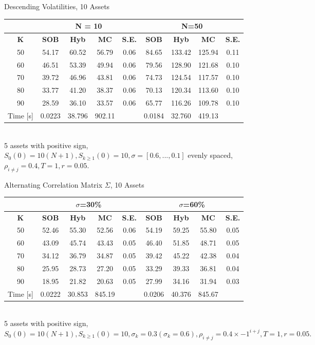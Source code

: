 \documentclass[a4paper]{article}
\begin{document}
\begin {table}[H]
\caption {Descending Volatilities, 10 Assets} 
\begin{center}
\begin{tabular}{c|c c c c|c c c c}
\hline
\multicolumn{1}{c|}{} & \multicolumn{4}{|c|}{N = 10} & \multicolumn{4}{|c}{N=50} \\ 
\hline
  \textbf{K} & \textbf{SOB} & \textbf{Hyb} & \textbf{MC} & \textbf{S.E.} & \textbf{SOB} & \textbf{Hyb} & \textbf{MC} & \textbf{S.E.}\\
50 &	54.17& 60.52 	& 56.79 & 0.06 & 84.65 & 133.42 & 125.94 & 0.11 \\
60 & 46.51	& 53.39 	& 49.94 & 0.06   & 79.56  & 128.90 & 121.68 & 0.10  \\
70 & 39.72	& 46.96	& 43.81 & 0.06  & 74.73 & 124.54 & 117.57 & 0.10\\
80 & 33.77	& 41.20 	& 38.37 & 0.06  & 70.13  & 120.34 & 113.60 & 0.10  \\
90 & 28.59& 36.10	& 33.57  & 0.06  & 65.77 & 116.26 & 109.78 &0.10\\
\hline
Time [s] & 0.0223 & 38.796 & 902.11 & & 0.0184 & 32.760 & 419.13 \\
\hline
\end{tabular}
\\[8pt]
\caption*{5 assets with positive sign, $S_0(0)=10(N+1), S_{k\geq1}(0) = 10, \sigma = [0.6, ..., 0.1]$ evenly spaced, $\rho_{i\neq j} = 0.4, T = 1, r=0.05.$}
\end{center}
\end{table}

\begin {table}
\caption {Alternating Correlation Matrix $\Sigma$, 10 Assets} 
\begin{center}
\begin{tabular}{c|c c c c|c c c c}
\hline
\multicolumn{1}{c|}{} & \multicolumn{4}{|c|}{$\sigma$=30\%} & \multicolumn{4}{|c}{$\sigma$=60\%} \\ 
\hline
  \textbf{K} & \textbf{SOB} & \textbf{Hyb} & \textbf{MC} & \textbf{S.E.} & \textbf{SOB} & \textbf{Hyb} & \textbf{MC} & \textbf{S.E.} \\
50 &	52.46&55.30	&52.56  &0.06  &54.19  &59.25&55.80&0.05  \\
60 & 	43.09&45.74 	&43.43  &0.05  &46.40  &51.85&48.71&0.05  \\
70 & 	34.12&36.79 	&34.87  &0.05  &39.42  &45.22&42.38&0.04  \\
80 & 	25.95&28.73 	&27.20  &0.05  &33.29  &39.33&36.81&0.04  \\
90 &  18.95&21.82 	&20.63  &0.05  &27.99  &34.16&31.94&0.03  \\
\hline
Time [s] & 0.0222&30.853 &845.19 & &0.0206  &40.376& 845.67& \\
\hline
\end{tabular}
\\[8pt]
\caption*{5 assets with positive sign, $S_0(0)=10(N+1), S_{k\geq1}(0) = 10, \sigma_k = 0.3 (\sigma_k = 0.6), \rho_{i\neq j} = 0.4\times-1^{i+j}, T = 1, r=0.05.$}
\end{center}
\end{table}
\end{document}
